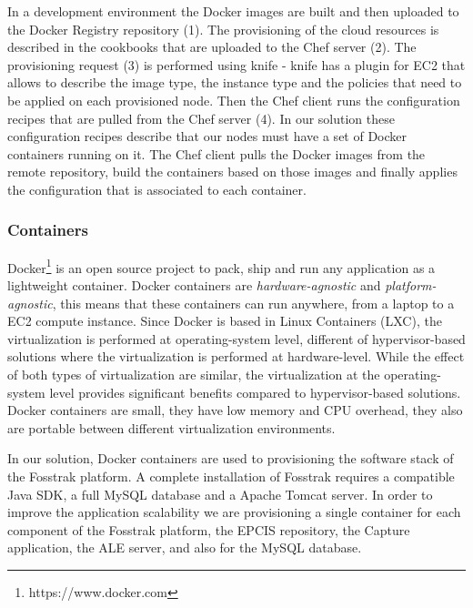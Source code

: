 In a development environment the Docker images are built and then uploaded to the Docker Registry
repository (1). The provisioning of the cloud resources is described in the cookbooks that are uploaded
to the Chef server (2). The provisioning request (3) is performed using knife - knife has a plugin for EC2
that allows to describe the image type, the instance type and the policies that need to be applied on
each provisioned node. Then the Chef client runs the configuration recipes that are pulled from the Chef server (4).
In our solution these configuration recipes describe that our nodes must have a set of Docker containers
running on it. The Chef client pulls the Docker images from the remote repository, build the
containers based on those images and finally applies the configuration that is associated to each container.

\subsubsection{Containers}
\label{subs:containers}
Docker\footnote{https://www.docker.com} is an open source project to pack, ship and run any application
as a lightweight container. Docker containers are \textit{hardware-agnostic} and \textit{platform-agnostic},
this means that these containers can run anywhere, from a laptop to a EC2 compute instance. Since Docker
is based in Linux Containers (LXC), the virtualization is performed at operating-system level, different of
hypervisor-based solutions where the virtualization is performed at hardware-level. While the effect of both
types of virtualization are similar, the virtualization at the operating-system level provides significant
benefits compared to hypervisor-based solutions\cite{Merkel}. Docker containers are small, they have low
memory and CPU overhead, they also are portable between different virtualization environments.

In our solution, Docker containers are used to provisioning the software stack of the Fosstrak platform.
A complete installation of Fosstrak requires a compatible Java SDK, a full MySQL database and
a Apache Tomcat server. In order to improve the application scalability we are provisioning a single container
for each component of the Fosstrak platform, the EPCIS repository, the Capture application, the ALE server,
and also for the MySQL database.

